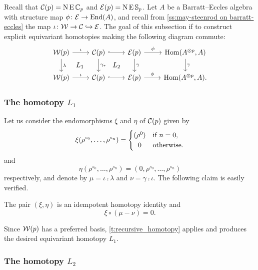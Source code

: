 Recall that $\mathcal{C}(p) = \operatorname{N} \operatorname{E} \mathbb{C}_p$ and $\mathcal{E}(p) = \operatorname{N} \operatorname{E} \mathbb{S}_p$.
Let $A$ be a Barratt--Eccles algebra with structure map $\phi \colon \mathcal{E} \to \mathrm{End}(A)$, and recall from \cref{ss:may-steenrod on barratt-eccles} the map $\iota \colon \mathcal{W} \to \mathcal{C} \hookrightarrow \mathcal{E}$.
The goal of this subsection if to construct explicit equivariant homotopies making the following diagram commute:
\[
\begin{tikzcd}
	\cW(p) \arrow[r, "\iota"] \arrow[d,"\lambda"] \arrow[dr,phantom,"L_1"] &
	\cC(p) \arrow[r, hook] \arrow[d, "\gamma_\ast"] \arrow[dr,phantom,"L_2"] &
	\BE(p) \arrow[r,"\phi"] \arrow[d,"\gamma"] &
	\Hom(A^{\ot p}, A) \arrow[d,"\gamma"] \\
	\cW(p) \arrow[r, "\iota"] &
	\cC(p) \arrow[r, hook] &
	\BE(p) \arrow[r,"\phi"] &
	\Hom(A^{\ot p}, A).
\end{tikzcd}
\]

\subsubsection{The homotopy $L_1$}

Let us consider the endomorphisms $\xi$ and $\eta$ of $\mathcal{C}(p)$ given by
\[
\xi(\rho^{s_0},\dots,\rho^{s_n}) =
\begin{cases}
	(\rho^0) & \text{if } n = 0, \\
	\hfil0 & \text{otherwise}.
\end{cases}
\]
and
\[
\eta(\rho^{s_0},\dots,\rho^{s_n}) = (0,\rho^{s_0},\dots,\rho^{s_n})
\]
respectively, and denote by $\mu = \iota \comp \lambda$ and $\nu = \gamma \comp \iota$.
The following claim is easily verified.

\begin{lemma}
	The pair $(\xi,\eta)$ is an idempotent homotopy identity and
	\[
	\xi \circ (\mu - \nu) = 0.
	\]
\end{lemma}
Since $\mathcal{W}(p)$ has a preferred basis, \cref{t:recursive_homotopy} applies and produces the desired equivariant homotopy $L_1$.

\subsubsection{The homotopy $L_2$}

